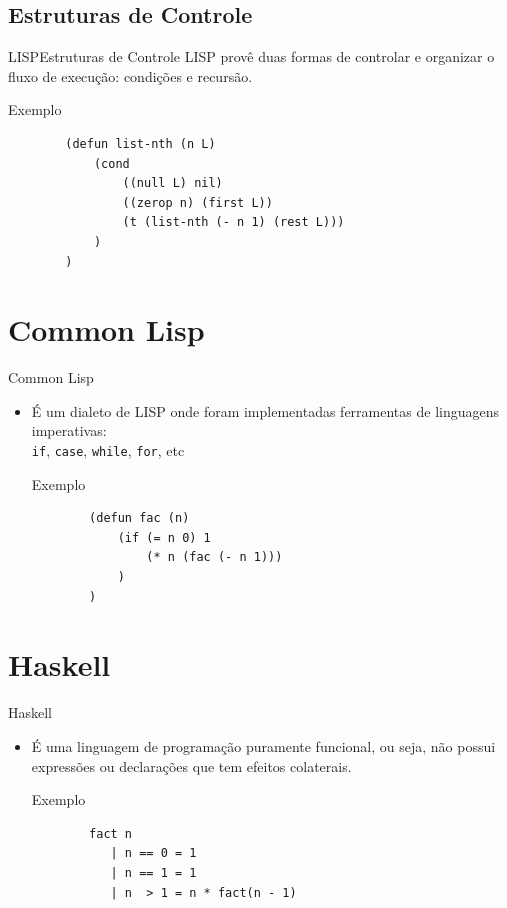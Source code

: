 \documentclass[12pt]{beamer} %
\begin{document}
\subsection{Estruturas de Controle}

\begin{frame}[fragile]{LISP}{Estruturas de Controle}
	LISP provê duas formas de controlar e organizar o fluxo de execução: condições e recursão.\\[\baselineskip]

	\begin{block}{Exemplo}
		\begin{verbatim}
		(defun list-nth (n L)
		    (cond
		        ((null L) nil)
		        ((zerop n) (first L))
		        (t (list-nth (- n 1) (rest L)))
		    )
		)
		\end{verbatim}
	\end{block}
\end{frame}

\section{Common Lisp}

\begin{frame}[fragile]{Common Lisp}
	\begin{itemize}
	\setlength\itemsep{1.5em}
		\item É um dialeto de LISP onde foram implementadas ferramentas de linguagens imperativas:\\
		\texttt{if}, \texttt{case}, \texttt{while}, \texttt{for}, etc\\[\baselineskip]

	\begin{block}{Exemplo}
		\begin{verbatim}
		(defun fac (n)
		    (if (= n 0) 1
		        (* n (fac (- n 1)))
		    )
		)
		\end{verbatim}
	\end{block}
	\end{itemize}
\end{frame}

\section{Haskell}

\begin{frame}[fragile]{Haskell}
	\begin{itemize}
	\setlength\itemsep{1.5em}
		\item É uma linguagem de programação puramente funcional, ou seja, não possui expressões ou declarações que tem efeitos colaterais.\\[\baselineskip]

	\begin{block}{Exemplo}
		\begin{verbatim}
		fact n
		   | n == 0 = 1
		   | n == 1 = 1
		   | n  > 1 = n * fact(n - 1)
		\end{verbatim}
	\end{block}
	\end{itemize}
\end{frame}
\end{document}
